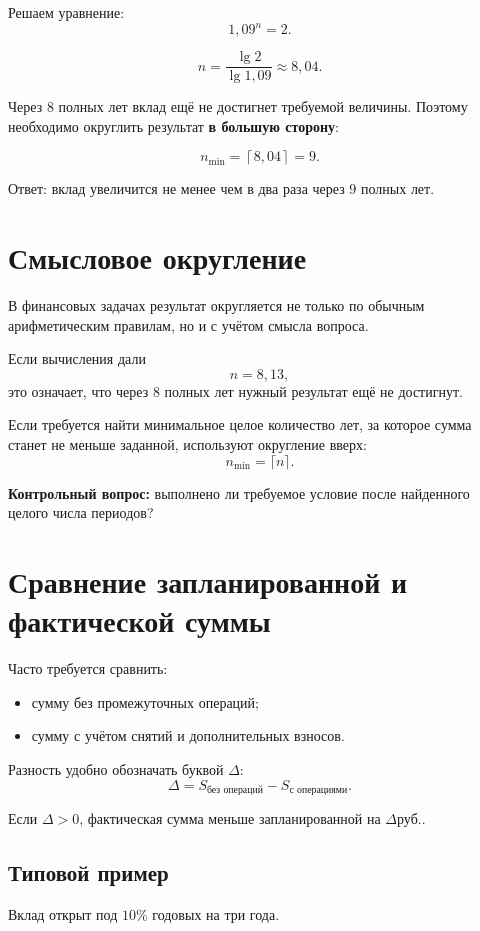 \documentclass[a4paper,12pt]{article}
\newcommand{\RUB}{\text{руб.}}
\newcommand{\important}[1]{\textbf{\color{darkaccent}#1}}
\begin{document}
Решаем уравнение:
\[
1{,}09^n=2.
\]

\[
n=\frac{\lg2}{\lg1{,}09}\approx8{,}04.
\]

Через \(8\) полных лет вклад ещё не достигнет требуемой величины. Поэтому
необходимо округлить результат \important{в большую сторону}:

\[
n_{\min}=\left\lceil8{,}04\right\rceil=9.
\]

Ответ: вклад увеличится не менее чем в два раза через \(9\) полных лет.

\section{Смысловое округление}

В финансовых задачах результат округляется не только по обычным
арифметическим правилам, но и с учётом смысла вопроса.

Если вычисления дали
\[
n=8{,}13,
\]
это означает, что через \(8\) полных лет нужный результат ещё не достигнут.

Если требуется найти минимальное целое количество лет, за которое сумма станет
не меньше заданной, используют округление вверх:
\[
n_{\min}=\lceil n\rceil.
\]

\important{Контрольный вопрос:} выполнено ли требуемое условие после найденного
целого числа периодов?

\section{Сравнение запланированной и фактической суммы}

Часто требуется сравнить:

\begin{itemize}
  \item сумму без промежуточных операций;
  \item сумму с учётом снятий и дополнительных взносов.
\end{itemize}

Разность удобно обозначать буквой \(\Delta\):
\[
\Delta
=
S_{\text{без операций}}
-
S_{\text{с операциями}}.
\]

Если \(\Delta>0\), фактическая сумма меньше запланированной на
\(\Delta\RUB\).

\subsection{Типовой пример}

Вклад открыт под \(10\%\) годовых на три года.
\end{document}
